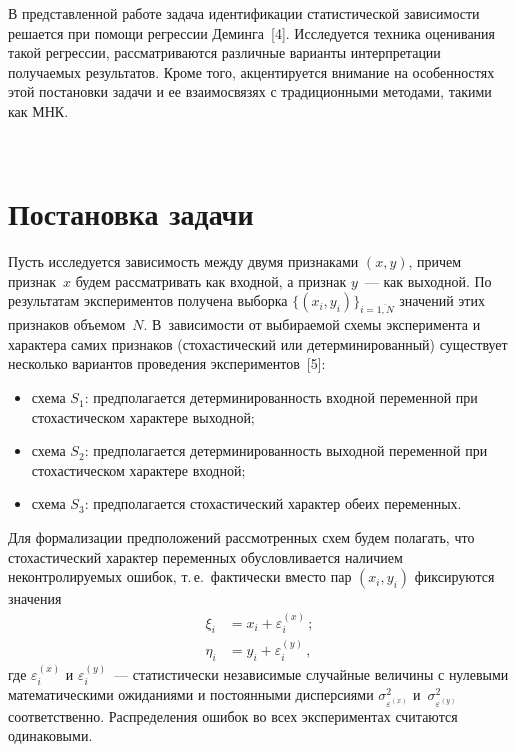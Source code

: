 \begin{multicols}{2}
  В представленной работе задача идентификации статистической
зависимости решается при помощи регрессии Деминга~[4]. Исследуется
техника оценивания такой регрессии, рассматриваются различные варианты
интерпретации получаемых результатов. Кроме того, акцентируется
внимание на особенностях этой постановки задачи и ее взаимосвязях с
традиционными методами, такими как МНК.

\begin{figure*}[b] %
  \vspace*{1pt}
 \begin{center}
 \mbox{%
 \epsfxsize=161.764mm
 }
 \end{center}
 \vspace*{-9pt}
  \end{figure*}

\section{Постановка задачи}

  Пусть исследуется зависимость между двумя признаками $(x,y)$, причем
признак~$x$ будем рас\-смат\-ри\-вать как входной, а признак $y$~--- как
выходной. По результатам экспериментов получена выборка
$\{(x_i,y_i)\}_{i=\overline{1,N}}$ значений этих признаков объемом~$N$.
В~зависимости от выбираемой схемы эксперимента и характера самих
признаков (стохастический или детерминированный) существует несколько
вариантов проведения экспериментов~[5]:
  \begin{itemize}
\item схема $S_1$: предполагается детерминированность входной
переменной при стохастическом характере выходной;
\item схема $S_2$: предполагается детерминированность выходной
переменной при стохастическом характере входной;
\item схема $S_3$: предполагается стохастический характер обеих
переменных.
\end{itemize}

  Для формализации предположений рас\-смот\-рен\-ных схем будем полагать,
что стохастический характер переменных обусловливается наличием
неконтролируемых ошибок, т.\,е.\ фактически вмес\-то пар $(x_i,y_i)$
фиксируются значения
  \begin{align}
  \xi_i&=x_i+\varepsilon_i^{(x)}\,;\label{e1-tim}\\
  \eta_i&= y_i+\varepsilon_i^{(y)}\,,\label{e2-tim}
  \end{align}
где $\varepsilon_i^{(x)}$ и $\varepsilon_i^{(y)}$~--- статистически независимые
случайные величины с нулевыми математическими ожиданиями и
постоянными дисперсиями $\sigma^2_{\varepsilon^{(x)}}$
и~$\sigma^2_{\varepsilon^{(y)}}$ соответственно. Распределения ошибок во
всех экспериментах считаются одинаковыми.


\end{multicols}
